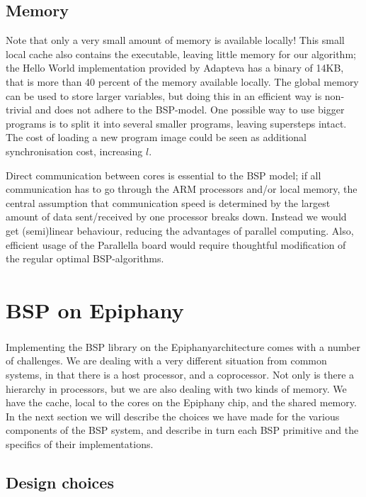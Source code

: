\documentclass[fleqn]{article}
\renewcommand{\(}{\left(}
\renewcommand{\)}{\right)}
\newcommand{\tm}{\textsuperscript{\texttrademark}}
\begin{document}
\subsection{Memory}
Note that only a very small amount of memory is available locally! This small local cache also contains the executable, leaving little memory for our algorithm; the Hello World implementation provided by Adapteva has a binary of 14KB, that is more than 40 percent of the memory available locally. The global memory can be used to store larger variables, but doing this in an efficient way is non-trivial and does not adhere to the BSP-model. One possible way to use bigger programs is to split it into several smaller programs, leaving supersteps intact. The cost of loading a new program image could be seen as additional synchronisation cost, increasing $l$.

Direct communication between cores is essential to the BSP model; if all communication has to go through the ARM processors and/or local memory, the central assumption that communication speed is determined by the largest amount of data sent/received by one processor breaks down. Instead we would get (semi)linear behaviour, reducing the advantages of parallel computing. Also, efficient usage of the Parallella board would require thoughtful modification of the regular optimal BSP-algorithms. 


\section{BSP on Epiphany\tm}

Implementing the BSP library on the Epiphany\tm architecture comes with a number of challenges. We are dealing with a very different situation from common systems, in that there is a host processor, and a coprocessor. Not only is there a hierarchy in processors, but we are also dealing with two kinds of memory. We have the cache, local to the cores on the Epiphany chip, and the shared memory. In the next section we will describe the choices we have made for the various components of the BSP system, and describe in turn each BSP primitive and the specifics of their implementations.

\subsection{Design choices}
\end{document}
